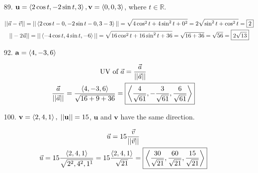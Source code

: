 \documentclass[10pt, letterpaper]{article}
\begin{document}
\begin{itemize}
        \item[89.] $\mathbf{u} = \expval{2\cos t, -2\sin t, 3}, \mathbf{v} = \expval{0, 0, 3}$, where $t \in \mathbb{R}$.
        
        \begin{mdframed}
            \begin{equation*}
                \begin{gathered}
                    ||\vec{u} - \vec{v}|| = ||\expval{2\cos t - 0, -2\sin t - 0, 3 - 3}|| 
                        = \sqrt{4\cos^{2}t + 4\sin^{2} t + 0^2} = 2\sqrt{\sin^{2}t + \cos^{2}t} = \boxed{2} \\
                    ||-2\vec{u}|| = ||\expval{-4\cos t, 4\sin t, -6}|| 
                        = \sqrt{16\cos^{2}t + 16\sin^{2}t + 36} = \sqrt{16 + 36} = \sqrt{56} = \boxed{2\sqrt{13}}
                \end{gathered}
            \end{equation*}
        \end{mdframed}

        \item [92.] $\mathbf{a} = \expval{4, -3, 6}$
        
        \begin{mdframed}
            \begin{equation*}
                \begin{gathered}
                    \text{UV of } \vec{a} = \frac{\vec{a}}{||\vec{a}||} \\
                    \frac{\vec{a}}{||\vec{a}||} = \frac{\expval{4, -3, 6}}{\sqrt{16 + 9 + 36}}
                    = \boxed{\expval{\frac{4}{\sqrt{61}}, -\frac{3}{\sqrt{61}}, \frac{6}{\sqrt{61}}}}
                \end{gathered}
            \end{equation*}
        \end{mdframed}

        \item [100.] $\mathbf{v} = \expval{2, 4, 1}, \; ||\mathbf{u}|| = 15$, $\mathbf{u}$ and $\mathbf{v}$ have the same direction.
        
        \begin{mdframed}
            \begin{equation*}
                \begin{gathered}
                    \vec{u} = 15\frac{\vec{v}}{||\vec{v}||} \\
                    \vec{u} = 15\frac{\expval{2, 4, 1}}{\sqrt{2^2, 4^2, 1^1}} 
                        = 15\frac{\expval{2, 4, 1}}{\sqrt{21}} 
                        = \boxed{\expval{\frac{30}{\sqrt{21}}, \frac{60}{\sqrt{21}}, \frac{15}{\sqrt{21}}}}
                \end{gathered}
            \end{equation*}
        \end{mdframed}


\end{itemize}
\end{document}
